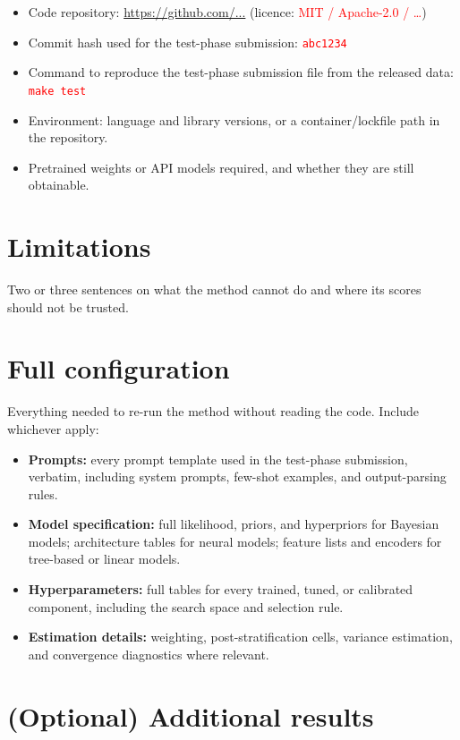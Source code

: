 \documentclass{article}
\begin{document}
\begin{itemize}[leftmargin=*]
  \item Code repository: \url{https://github.com/...} (licence: \textcolor{red}{MIT / Apache-2.0 / \ldots})
  \item Commit hash used for the test-phase submission: \texttt{\textcolor{red}{abc1234}}
  \item Command to reproduce the test-phase submission file from the released data: \texttt{\textcolor{red}{make test}}
  \item Environment: language and library versions, or a container/lockfile path in the repository.
  \item Pretrained weights or API models required, and whether they are still obtainable.
\end{itemize}

\section{Limitations}
\label{sec:limitations}

Two or three sentences on what the method cannot do and where its scores should not be trusted.




\clearpage
\appendix

\section{Full configuration}
Everything needed to re-run the method without reading the code. Include whichever apply:
\begin{itemize}[leftmargin=*]
  \item \textbf{Prompts:} every prompt template used in the test-phase submission, verbatim, including system prompts, few-shot examples, and output-parsing rules.
  \item \textbf{Model specification:} full likelihood, priors, and hyperpriors for Bayesian models; architecture tables for neural models; feature lists and encoders for tree-based or linear models.
  \item \textbf{Hyperparameters:} full tables for every trained, tuned, or calibrated component, including the search space and selection rule.
  \item \textbf{Estimation details:} weighting, post-stratification cells, variance estimation, and convergence diagnostics where relevant.
\end{itemize}

\section{(Optional) Additional results}
\end{document}
